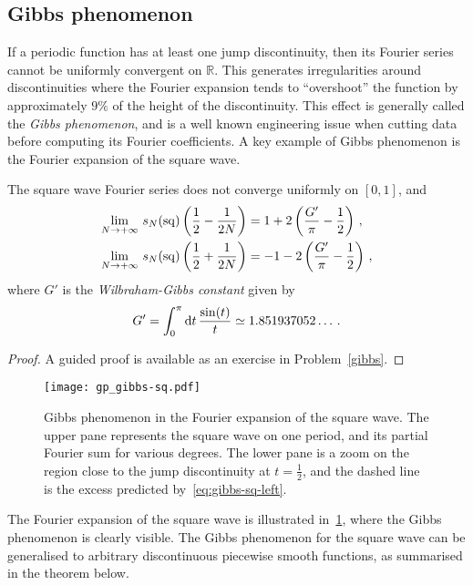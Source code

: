 \subsection{Gibbs phenomenon}
If a periodic function has at least one jump discontinuity, then its Fourier series cannot
be uniformly convergent on $\mathbb{R}$. This generates irregularities around
discontinuities where the Fourier expansion tends to ``overshoot'' the function by
approximately $9\%$ of the height of the discontinuity. This effect is generally called
the \emph{Gibbs phenomenon}, and is a well known engineering issue when cutting data
before computing its Fourier coefficients. A key example of Gibbs phenomenon is the
Fourier expansion of the square wave.
\begin{lemma}
  \label{lem:gibbs-sq}
  The square wave Fourier series does not converge uniformly on $[0,1]$, and
  \begin{align}
    \lim_{N\to+\infty}\,s_N(\operatorname{sq})\left(\frac12-\frac{1}{2N}\right)
    &=1+2\left(\frac{G'}{\pi}-\frac12\right)\,,\label{eq:gibbs-sq-left}\\
    \lim_{N\to+\infty}\,s_N(\operatorname{sq})\left(\frac12+\frac{1}{2N}\right)
    &=-1-2\left(\frac{G'}{\pi}-\frac12\right)\,,\label{eq:gibbs-sq-right}
  \end{align}
  where $G'$ is the \emph{Wilbraham-Gibbs constant} given by
  \begin{equation}
    G'=\int_0^\pi\mathrm{d} t\,\frac{\sin(t)}{t}\simeq1.851937052\dots\,.
  \end{equation}
\end{lemma}
\begin{proof}
  A guided proof is available as an exercise in Problem~\ref{gibbs}.
\end{proof}
\begin{figure}[t]
  \centering
  \texttt{[image: gp\_gibbs-sq.pdf]}
  \caption{Gibbs phenomenon in the Fourier expansion of the square wave. The upper pane
    represents the square wave on one period, and its partial Fourier sum for various
    degrees. The lower pane is a zoom on the region close to the jump discontinuity at
  $t=\frac12$, and the dashed line is the excess predicted by~\cref{eq:gibbs-sq-left}.}
  \label{fig:gibbs-sq}
\end{figure}
The Fourier expansion of the square wave is illustrated in~\cref{fig:gibbs-sq}, where the
Gibbs phenomenon is clearly visible. The Gibbs phenomenon for the square wave can be
generalised to arbitrary discontinuous piecewise smooth functions, as summarised in the
theorem below.

